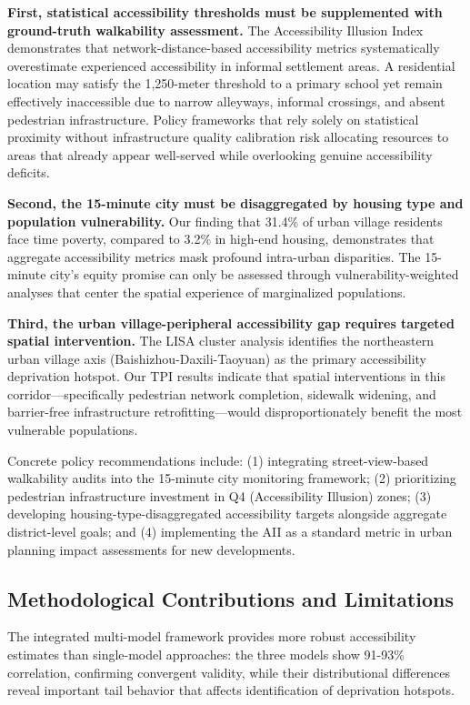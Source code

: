 \documentclass[preprint,12pt,authoryear]{elsarticle}
\begin{document}
\textbf{First, statistical accessibility thresholds must be supplemented with ground-truth walkability assessment.} The Accessibility Illusion Index demonstrates that network-distance-based accessibility metrics systematically overestimate experienced accessibility in informal settlement areas. A residential location may satisfy the 1,250-meter threshold to a primary school yet remain effectively inaccessible due to narrow alleyways, informal crossings, and absent pedestrian infrastructure. Policy frameworks that rely solely on statistical proximity without infrastructure quality calibration risk allocating resources to areas that already appear well-served while overlooking genuine accessibility deficits.

\textbf{Second, the 15-minute city must be disaggregated by housing type and population vulnerability.} Our finding that 31.4\% of urban village residents face time poverty, compared to 3.2\% in high-end housing, demonstrates that aggregate accessibility metrics mask profound intra-urban disparities. The 15-minute city's equity promise can only be assessed through vulnerability-weighted analyses that center the spatial experience of marginalized populations.

\textbf{Third, the urban village-peripheral accessibility gap requires targeted spatial intervention.} The LISA cluster analysis identifies the northeastern urban village axis (Baishizhou-Daxili-Taoyuan) as the primary accessibility deprivation hotspot. Our TPI results indicate that spatial interventions in this corridor---specifically pedestrian network completion, sidewalk widening, and barrier-free infrastructure retrofitting---would disproportionately benefit the most vulnerable populations.

Concrete policy recommendations include: (1) integrating street-view-based walkability audits into the 15-minute city monitoring framework; (2) prioritizing pedestrian infrastructure investment in Q4 (Accessibility Illusion) zones; (3) developing housing-type-disaggregated accessibility targets alongside aggregate district-level goals; and (4) implementing the AII as a standard metric in urban planning impact assessments for new developments.

\subsection{Methodological Contributions and Limitations}
\label{sec:method_contributions}

The integrated multi-model framework provides more robust accessibility estimates than single-model approaches: the three models show 91-93\% correlation, confirming convergent validity, while their distributional differences reveal important tail behavior that affects identification of deprivation hotspots.
\end{document}
